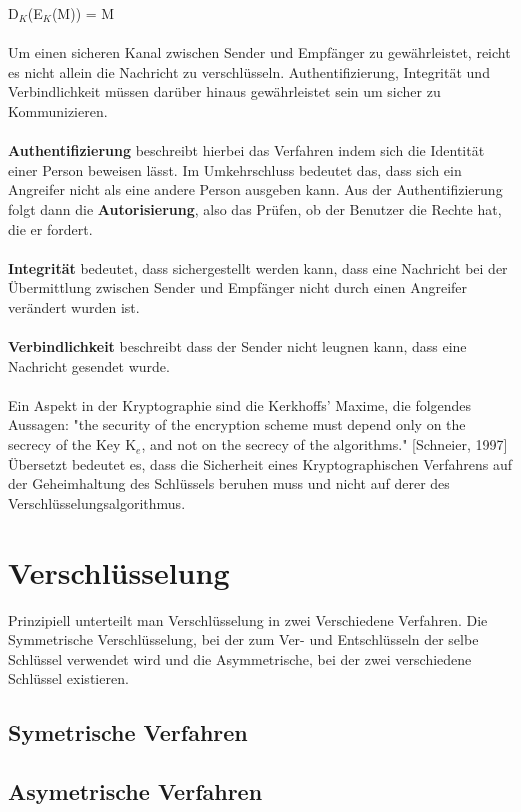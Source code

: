 \documentclass[10pt, a4paper]{scrreprt}
\begin{document}
D$_{K}$(E$_{K}$(M)) = M\\ \\
Um einen sicheren Kanal zwischen Sender und Empfänger zu gewährleistet, reicht es nicht allein die Nachricht zu verschlüsseln. Authentifizierung, Integrität und Verbindlichkeit müssen darüber hinaus gewährleistet sein um sicher zu Kommunizieren. \\ \\
\textbf{Authentifizierung} beschreibt hierbei das Verfahren indem sich die Identität einer Person beweisen lässt. Im Umkehrschluss bedeutet das, dass sich ein Angreifer nicht als eine andere Person ausgeben kann. Aus der Authentifizierung folgt dann die \textbf{Autorisierung}, also das Prüfen, ob der Benutzer die Rechte hat, die er fordert.\\ \\
\textbf{Integrität} bedeutet, dass sichergestellt werden kann, dass eine Nachricht bei der Übermittlung zwischen Sender und Empfänger nicht durch einen Angreifer verändert wurden ist. \\ \\
\textbf{Verbindlichkeit} beschreibt  dass der Sender nicht leugnen kann, dass eine Nachricht gesendet wurde. \\ \\
Ein Aspekt in der Kryptographie sind die Kerkhoffs' Maxime, die folgendes Aussagen: "the security of the encryption scheme must depend only on the secrecy of the Key K$_{e}$, and not on the secrecy of the algorithms." [Schneier, 1997] Übersetzt bedeutet es, dass die Sicherheit eines Kryptographischen Verfahrens  auf der Geheimhaltung des Schlüssels beruhen muss und nicht auf derer des Verschlüsselungsalgorithmus.


\section{Verschlüsselung}
Prinzipiell unterteilt man Verschlüsselung in zwei Verschiedene Verfahren. Die Symmetrische Verschlüsselung, bei der zum Ver- und Entschlüsseln der selbe Schlüssel verwendet wird und die Asymmetrische, bei der zwei verschiedene Schlüssel existieren.
\subsection{Symetrische Verfahren}
\subsection{Asymetrische Verfahren}
\end{document}
